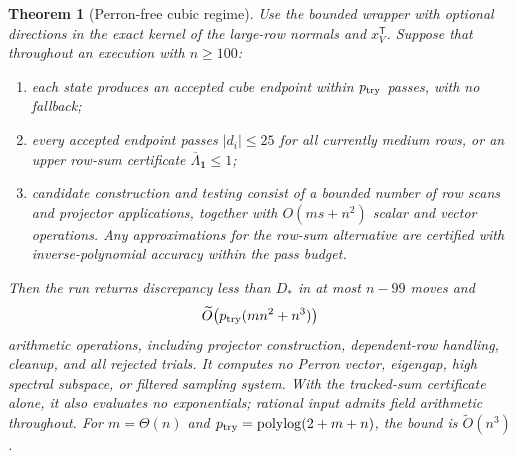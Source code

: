 \documentclass[11pt]{amsart}
\newtheorem{theorem}{Theorem}[section]
\theoremstyle{definition}\newtheorem{definition}[theorem]{Definition}
\theoremstyle{remark}\newtheorem{remark}[theorem]{Remark}
\numberwithin{equation}{section}
\newcommand{\one}{\mathbf1}
\newcommand{\T}{\mathsf T}
\begin{document}
\newpage
\begin{theorem}[Perron-free cubic regime]\label{ep:cubic}
Use the bounded wrapper with optional directions in the exact kernel
of the large-row normals and $x_V^\T$. Suppose that throughout an
execution with $n\ge100$:
\begin{enumerate}
\item each state produces an accepted cube endpoint within
$p_{\rm try}$ passes, with no fallback;
\item every accepted endpoint passes $|d_i|\le25$ for all currently
medium rows, or an upper row-sum certificate $\overline\Lambda_{\one}\le1$;
\item candidate construction and testing consist of a bounded number
of row scans and projector applications, together with $O(ms+n^2)$
scalar and vector operations. Any approximations for the row-sum alternative
are certified with inverse-polynomial accuracy within the pass budget.
\end{enumerate}
Then the run returns discrepancy less than $D_*$ in at most $n-99$
moves and
\begin{equation}\label{ep:cubic-cost}
 \widetilde O\bigl(p_{\rm try}(mn^2+n^3)\bigr)
\end{equation}
arithmetic operations, including projector construction, dependent-row
handling, cleanup, and all rejected trials. It computes no Perron
vector, eigengap, high spectral subspace, or filtered sampling system.
With the tracked-sum certificate alone, it also evaluates no
exponentials; rational input admits field arithmetic throughout.
For $m=\Theta(n)$ and $p_{\rm try}=\operatorname{polylog}(2+m+n)$,
the bound is $\widetilde O(n^3)$.
\end{theorem}
\end{document}
